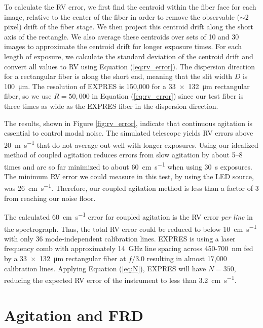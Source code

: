 To calculate the RV error, we first find the centroid within the fiber face for each image, relative to the center of the fiber in order to remove the observable ($\sim 2$ pixel) drift of the fiber stage. We then project this centroid drift along the short axis of the rectangle. We also average these centroids over sets of 10 and 30 images to approximate the centroid drift for longer exposure times. For each length of exposure, we calculate the standard deviation of the centroid drift and convert all values to RV using Equation (\ref{eq:rv_error}). The dispersion direction for a rectangular fiber is along the short end, meaning that the slit width $D$ is \SI{100}{\micro\meter}. The resolution of EXPRES is 150,000 for a \SI{33x132}{\micro\meter} rectangular fiber, so we use $R=50,000$ in Equation (\ref{eq:rv_error}) since our test fiber is three times as wide as the EXPRES fiber in the dispersion direction.

The results, shown in Figure \ref{fig:rv_error}, indicate that continuous agitation is essential to control modal noise. The simulated telescope yields RV errors above \SI{20}{\meter\per\second} that do not average out well with longer exposures. Using our idealized method of coupled agitation reduces errors from slow agitation by about 5--8 times and are so far minimized to about \SI{60}{\centi\meter\per\second} when using \SI{30}{\second} exposures. The minimum RV error we could measure in this test, by using the LED source, was \SI{26}{\centi\meter\per\second}. Therefore, our coupled agitation method is less than a factor of 3 from reaching our noise floor.

The calculated \SI{60}{\centi\meter\per\second} error for coupled agitation is the RV error \textit{per line} in the spectrograph. Thus, the total RV error could be reduced to below \SI{10}{\centi\meter\per\second} with only 36 mode-independent calibration lines. EXPRES is using a laser frequency comb with approximately {\SI{14}{\giga\hertz}} line spacing across 450-{\SI{700}{\nano\meter}} fed by a {\SI{33x132}{\micro\meter}} rectangular fiber at $f/3.0$ resulting in almost 17,000 calibration lines. Applying Equation (\ref{eq:N}), EXPRES will have $N=350$, reducing the expected RV error of the instrument to less than {\SI{3.2}{\centi\meter\per\second}}.

\section{Agitation and FRD}
\label{sec:frd}

